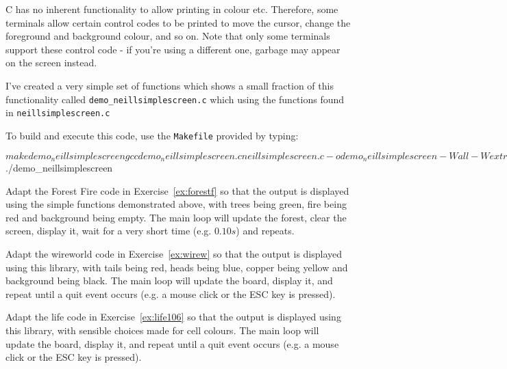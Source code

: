 C has no inherent functionality to allow printing in colour etc.
Therefore, some terminals allow certain control codes to be printed
to move the cursor, change the foreground and background colour, and
so on.
Note that only some terminals support these control code - if you're
using a different one, garbage may appear on the screen instead.

I've created a very simple set of functions which shows a small
fraction of this functionality called \verb^demo_neillsimplescreen.c^
which using the functions found in \verb^neillsimplescreen.c^

To build and execute this code, use the \verb^Makefile^ provided by typing:
\begin{terminaloutput}
$ make demo_neillsimplescreen
gcc demo_neillsimplescreen.c neillsimplescreen.c
-o demo_neillsimplescreen -Wall -Wextra -pedantic 
-std=c99 -Wvla -g3 -fsanitize=undefined -fsanitize=address -lm
$ ./demo_neillsimplescreen 
\end{terminaloutput}

\begin{exercise}
Adapt the Forest Fire code in Exercise~\ref{ex:forestf} so that the
output is displayed using the simple functions demonstrated above,
with trees being green, fire being red and background being empty.
The main loop will update the forest, clear the screen, display it,
wait for a very short time (e.g. $0.10s$) and repeats.
\end{exercise}

\begin{exercise}
Adapt the wireworld code in Exercise~\ref{ex:wirew} so that the output
is displayed using this library, with tails being red, heads being blue,
copper being yellow and background being black.  The main loop will
update the board, display it, and repeat until a quit event occurs
(e.g. a mouse click or the ESC key is pressed).
\end{exercise}


\begin{exercise}
Adapt the life code in Exercise~\ref{ex:life106} so that the output is
displayed using this library, with sensible choices made for cell colours.
The main loop will update the board, display it, and repeat until a quit
event occurs (e.g. a mouse click or the ESC key is pressed).
\end{exercise}

